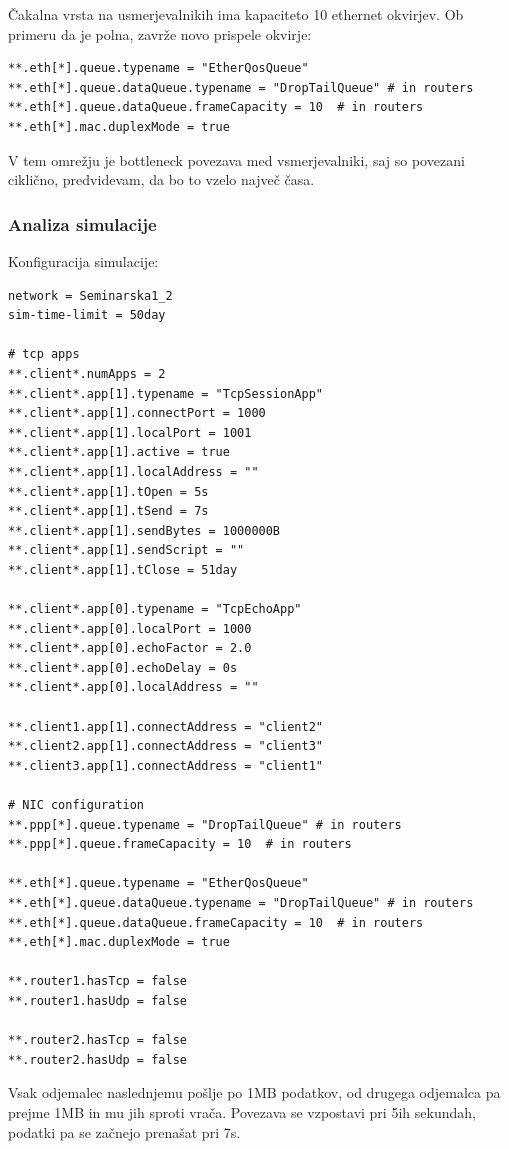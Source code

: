 \documentclass[11pt,a4paper,slovene]{myarticle}
\begin{document}
Čakalna vrsta na usmerjevalnikih ima kapaciteto 10 ethernet okvirjev. Ob primeru da je polna, zavrže novo prispele okvirje:
\begin{lstlisting}
**.eth[*].queue.typename = "EtherQosQueue"
**.eth[*].queue.dataQueue.typename = "DropTailQueue" # in routers
**.eth[*].queue.dataQueue.frameCapacity = 10  # in routers
**.eth[*].mac.duplexMode = true
\end{lstlisting}

V tem omrežju je bottleneck povezava med vsmerjevalniki, saj so povezani ciklično, predvidevam, da bo to vzelo največ časa.


\subsubsection{Analiza simulacije}

Konfiguracija simulacije:

\begin{lstlisting}
network = Seminarska1_2
sim-time-limit = 50day

# tcp apps
**.client*.numApps = 2
**.client*.app[1].typename = "TcpSessionApp"
**.client*.app[1].connectPort = 1000
**.client*.app[1].localPort = 1001
**.client*.app[1].active = true
**.client*.app[1].localAddress = ""
**.client*.app[1].tOpen = 5s
**.client*.app[1].tSend = 7s
**.client*.app[1].sendBytes = 1000000B
**.client*.app[1].sendScript = ""
**.client*.app[1].tClose = 51day

**.client*.app[0].typename = "TcpEchoApp"
**.client*.app[0].localPort = 1000
**.client*.app[0].echoFactor = 2.0
**.client*.app[0].echoDelay = 0s
**.client*.app[0].localAddress = ""

**.client1.app[1].connectAddress = "client2"
**.client2.app[1].connectAddress = "client3"
**.client3.app[1].connectAddress = "client1"

# NIC configuration
**.ppp[*].queue.typename = "DropTailQueue" # in routers
**.ppp[*].queue.frameCapacity = 10  # in routers

**.eth[*].queue.typename = "EtherQosQueue"
**.eth[*].queue.dataQueue.typename = "DropTailQueue" # in routers
**.eth[*].queue.dataQueue.frameCapacity = 10  # in routers
**.eth[*].mac.duplexMode = true

**.router1.hasTcp = false
**.router1.hasUdp = false

**.router2.hasTcp = false
**.router2.hasUdp = false
\end{lstlisting}

Vsak odjemalec naslednjemu pošlje po 1MB podatkov, od drugega odjemalca pa prejme 1MB in mu jih sproti vrača. Povezava se vzpostavi pri 5ih sekundah, podatki pa se začnejo prenašat pri 7s.
\end{document}

